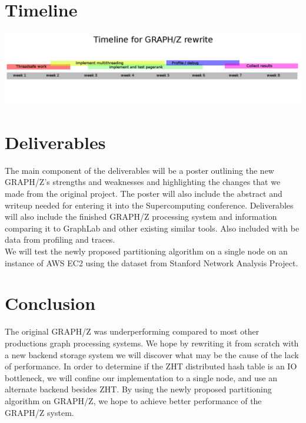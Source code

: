 \documentclass[10pt]{article}
\begin{document}
  \section{Timeline}
  \includegraphics[width=\textwidth]{timeline.png}
\begin{multicols}{2}
  \section{Deliverables}
  The main component of the deliverables will be a poster outlining the new GRAPH/Z's strengths and weaknesses and highlighting the changes that we made from the original project. The poster will also include the abstract and writeup needed for entering it into the Supercomputing conference.  Deliverables will also include the finished GRAPH/Z processing system and information comparing it to GraphLab and other existing similar tools. Also included with be data from profiling and traces. \\
  We will test the newly proposed partitioning algorithm on a single node on an instance of AWS EC2 using the dataset from Stanford Network Analysis Project.
  
   \section{Conclusion}
   The original GRAPH/Z was underperforming compared to most other productions graph processing systems. We hope by rewriting it from scratch with a new backend storage system we will discover what may be the cause of the lack of performance. In order to determine if the ZHT distributed hash table is an IO bottleneck, we will confine our implementation to a single node, and use an alternate backend besides ZHT. By using the newly proposed partitioning algorithm on GRAPH/Z, we hope to achieve better performance of the GRAPH/Z system. 

   
   
\end{multicols}
\end{document}
